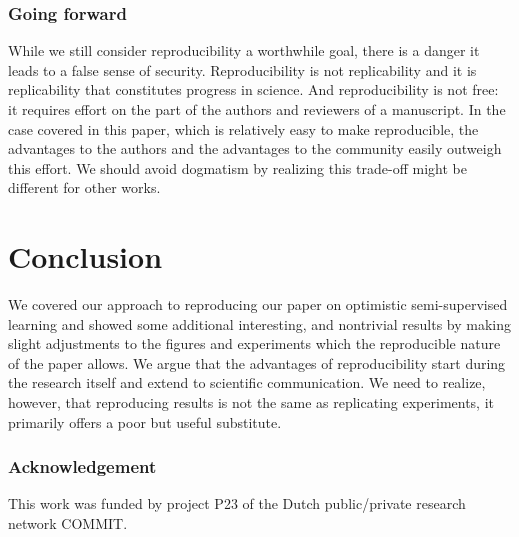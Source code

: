 \documentclass[runningheads,a4paper]{llncs}\usepackage[]{graphicx}\usepackage[]{color}
\begin{document}
\subsubsection{Going forward}
While we still consider reproducibility a worthwhile goal, there is a danger it leads to a false sense of security. Reproducibility is not replicability and it is replicability that constitutes progress in science. And reproducibility is not free: it requires effort on the part of the authors and reviewers of a manuscript. In the case covered in this paper, which is relatively easy to make reproducible, the advantages to the authors and the advantages to the community easily outweigh this effort. We should avoid dogmatism by realizing this trade-off might be different for other works.

\section{Conclusion}
We covered our approach to reproducing our paper on optimistic semi-supervised learning and showed some additional interesting, and nontrivial results by making slight adjustments to the figures and experiments which the reproducible nature of the paper allows. We argue that the advantages of reproducibility start during the research itself and extend to scientific communication. We need to realize, however, that reproducing results is not the same as replicating experiments, it primarily offers a poor but useful substitute.

\subsubsection*{Acknowledgement}
This work was funded by project P23 of the Dutch public/private research network COMMIT.



\end{document}
